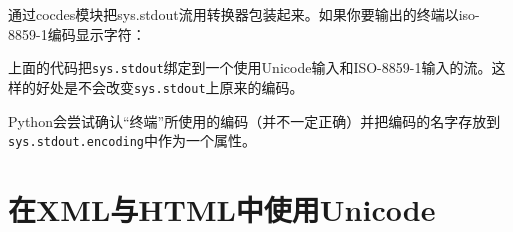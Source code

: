 		通过cocdes模块把sys.stdout流用转换器包装起来。如果你要输出的终端以iso-8859-1编码显示字符：

		

		上面的代码把\verb|sys.stdout|绑定到一个使用Unicode输入和ISO-8859-1输入的流。这样的好处是不会改变\verb|sys.stdout|上原来的编码。

		Python会尝试确认“终端”所使用的编码（并不一定正确）并把编码的名字存放到\verb|sys.stdout.encoding|中作为一个属性。

	\section{在XML与HTML中使用Unicode}


		

		

		
